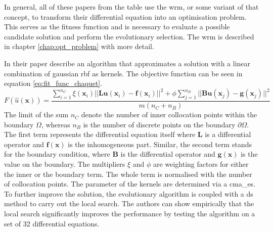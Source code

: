 \documentclass[./\jobname.tex]{subfiles}
\begin{document}
In general, all of these papers from the table use the \gls{wrm}, or some variant of that concept, to transform their differential equation into an optimisation problem. This serves as the fitness function and is necessary to evaluate a possible candidate solution and perform the evolutionary selection. The \gls{wrm} is described in chapter \ref{chap:opt_problem} with more detail. 

In their paper \cite{chaquet_using_2019} describe an algorithm that approximates a solution with a linear combination of gaussian \gls{rbf} as kernels. The objective function can be seen in equation \ref{eq:fit_func_chaquet}. 
\begin{equation}
\label{eq:fit_func_chaquet}
F(\hat{u}(\mathbf{x})) = \frac{\sum_{i=1}^{n_C} \xi (\mathbf{x}_i) || \mathbf{Lu}(\mathbf{x}_i) - \mathbf{f}(\mathbf{x}_i)||^2 + \phi \sum_{j=1}^{n_B} || \mathbf{Bu}(\mathbf{x}_j) - \mathbf{g}(\mathbf{x}_j)||^2}{m (n_C + n_B)}  
\end{equation}
The limit of the sum $n_C$ denote the number of inner collocation points within the boundary $\Omega$, whereas $n_B$ is the number of discrete points on the boundary $\partial \Omega$. The first term represents the differential equation itself where $\mathbf{L}$ is a differential operator and $\mathbf{f}(\mathbf{x})$ is the inhomogeneous part. Similar, the second term stands for the boundary condition, where $\mathbf{B}$ is the differential operator and $\mathbf{g}(\mathbf{x})$ is the value on the boundary. The multipliers $\xi$ and $\phi$ are weighting factors for either the inner or the boundary term. The whole term is normalised with the number of collocation points. 
The parameter of the kernels are determined via a \gls{cma_es}. To further improve the solution, the evolutionary algorithm is coupled with a \gls{ds} method to carry out the local search. The authors can show empirically that the local search significantly improves the performance by testing the algorithm on a set of 32 differential equations. 
\end{document}
